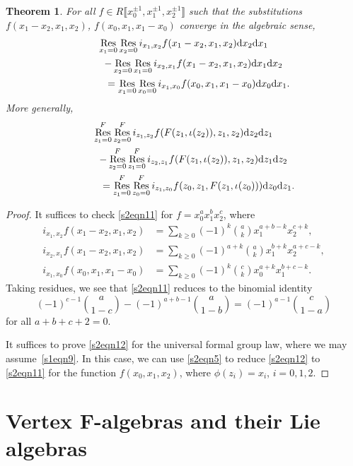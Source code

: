 \documentclass[10pt,a4paper]{amsart}
\numberwithin{equation}{section}
\newtheorem{Theorem}{Theorem}[section]
\theoremstyle{definition}
\DeclareMathOperator\Res{Res}
\def\lb{\llbracket}
\def\rb{\rrbracket}
\begin{document}
\begin{Theorem}
 For all $f\in R\big\lb x_0^{\pm1}, x_1^{\pm1}, x_2^{\pm1}\big\rb$ such that the substitutions $f(x_1-x_2,x_1,x_2)$, $f(x_0,x_1,x_1-x_0)$ converge in the algebraic sense,
 \begin{gather}
 \Res_{x_1=0}\Res_{x_2=0}i_{x_1,x_2} f(x_1-x_2,x_1,x_2) {\rm d}x_2 {\rm d}x_1\nonumber\\
\qquad -\Res_{x_2=0}\Res_{x_1=0}i_{x_2,x_1} f(x_1-x_2,x_1,x_2) {\rm d}x_1 {\rm d}x_2\nonumber\\
 \phantom{\qquad -}{}=\Res_{x_1=0}\Res_{x_0=0}i_{x_1,x_0} f(x_0,x_1,x_1-x_0) {\rm d}x_0 {\rm d}x_1. \label{s2eqn11}
 \end{gather}
 More generally,
 \begin{gather}
 \Res^F_{z_1=0}\Res^F_{z_2=0}i_{z_1,z_2} f(F(z_1,\iota(z_2)),z_1,z_2) {\rm d}z_2 {\rm d}z_1\nonumber\\
 \qquad-\Res^F_{z_2=0}\Res^F_{z_1=0}i_{z_2,z_1} f(F(z_1,\iota(z_2)),z_1,z_2) {\rm d}z_1 {\rm d}z_2\nonumber\\
 \phantom{\qquad -}{}=\Res^F_{z_1=0}\Res^F_{z_0=0}i_{z_1,z_0} f(z_0,z_1,F(z_1,\iota(z_0))) {\rm d}z_0 {\rm d}z_1. \label{s2eqn12}
 \end{gather}
\end{Theorem}
\begin{proof}
 It suffices to check \eqref{s2eqn11} for $f=x_0^a x_1^b x_2^c$, where
 \begin{align*}
 i_{x_1,x_2} f(x_1-x_2,x_1,x_2)&=\sum_{k\geqslant0}(-1)^k\binom{a}{k} x_1^{a+b-k}x_2^{c+k},\\
 i_{x_2,x_1} f(x_1-x_2,x_1,x_2)&=\sum_{k\geqslant0}(-1)^{a+k}\binom{a}{k} x_1^{b+k}x_2^{a+c-k},\\
 i_{x_1,x_0} f(x_0,x_1,x_1-x_0)&=\sum_{k\geqslant0}(-1)^k\binom{c}{k}x_0^{a+k}x_1^{b+c-k}.
 \end{align*}
 Taking residues, we see that \eqref{s2eqn11} reduces to the binomial identity
 \[
 (-1)^{c-1}\binom{a}{1-c}-(-1)^{a+b-1}\binom{a}{1-b}=(-1)^{a-1}\binom{c}{1-a}
 \]
 for all $a+b+c+2=0$.

 It suffices to prove \eqref{s2eqn12} for the universal formal group law, where we may assume~\eqref{s1eqn9}. In this case, we can use \eqref{s2eqn5} to reduce \eqref{s2eqn12} to \eqref{s2eqn11} for the function $f(x_0,x_1,x_2)$, where $\phi(z_i)=x_i$, $i=0,1,2$.
\end{proof}

\section[Vertex F-algebras and their Lie algebras]{Vertex $\boldsymbol{F}$-algebras and their Lie algebras}
\label{s4}
\end{document}
